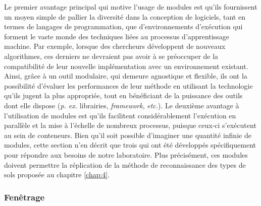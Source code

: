 Le premier avantage principal qui motive l'usage de modules est qu'ils fournissent un moyen simple de pallier la diversité dans la conception de logiciels, tant en termes de langages de programmation, que d'environnements d'exécution qui forment le vaste monde des techniques liées au processus d'apprentissage machine. Par exemple, lorsque des chercheurs développent de nouveaux algorithmes, ces derniers ne devraient pas avoir à se préoccuper de la compatibilité de leur nouvelle implémentation avec un environnement existant. Ainsi, grâce à un outil modulaire, qui demeure agnostique et flexible, ils ont la possibilité d'évaluer les performances de leur méthode en utilisant la technologie qu'ils jugent la plus appropriée, tout en bénéficiant de la puissance des outils dont elle dispose (\textit{p. ex.} librairies, \textit{framework}, \textit{etc.}). Le deuxième avantage à l'utilisation de modules est qu'ils facilitent considérablement l'exécution en parallèle et la mise à l'échelle de nombreux processus, puisque ceux-ci s'exécutent au sein de conteneurs. Bien qu'il soit possible d'imaginer une quantité infinie de modules, cette section n'en décrit que trois qui ont été développés spécifiquement pour répondre aux besoins de notre laboratoire. Plus précisément, ces modules doivent permettre la réplication de la méthode de reconnaissance des types de sols proposée au chapitre \ref{chap:4}.

\subsubsection{Fenêtrage}

